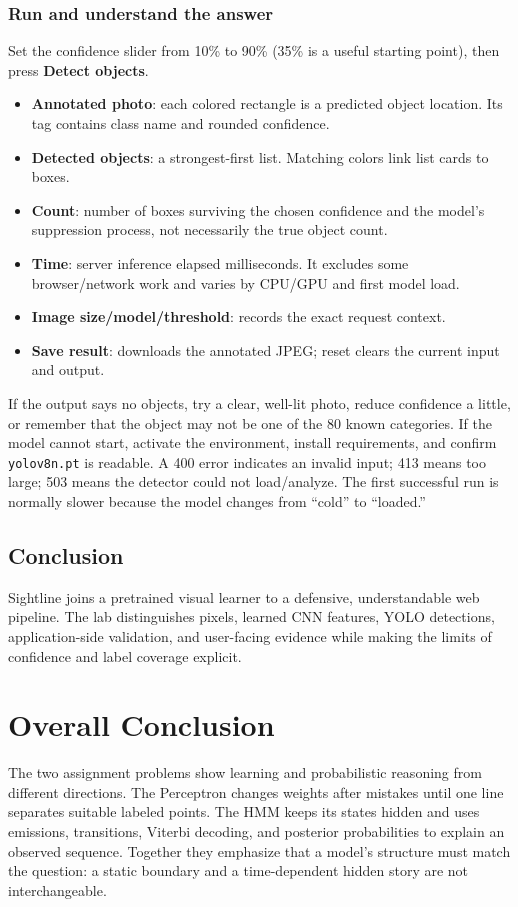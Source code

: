 \documentclass[12pt,a4paper,openany]{report}
\begin{document}
\subsection{Run and understand the answer}
Set the confidence slider from 10\% to 90\% (35\% is a useful starting point),
then press \textbf{Detect objects}.
\begin{itemize}
  \item \textbf{Annotated photo}: each colored rectangle is a predicted object
  location. Its tag contains class name and rounded confidence.
  \item \textbf{Detected objects}: a strongest-first list. Matching colors link
  list cards to boxes.
  \item \textbf{Count}: number of boxes surviving the chosen confidence and the
  model's suppression process, not necessarily the true object count.
  \item \textbf{Time}: server inference elapsed milliseconds. It excludes some
  browser/network work and varies by CPU/GPU and first model load.
  \item \textbf{Image size/model/threshold}: records the exact request context.
  \item \textbf{Save result}: downloads the annotated JPEG; reset clears the
  current input and output.
\end{itemize}

If the output says no objects, try a clear, well-lit photo, reduce confidence a
little, or remember that the object may not be one of the 80 known categories.
If the model cannot start, activate the environment, install requirements, and
confirm \texttt{yolov8n.pt} is readable. A 400 error indicates an invalid input;
413 means too large; 503 means the detector could not load/analyze. The first
successful run is normally slower because the model changes from ``cold'' to
``loaded.''

\section{Conclusion}
Sightline joins a pretrained visual learner to a defensive, understandable web
pipeline. The lab distinguishes pixels, learned CNN features, YOLO detections,
application-side validation, and user-facing evidence while making the limits
of confidence and label coverage explicit.

\fi
\chapter*{Overall Conclusion}
\ifdefined\AssignmentVersion
The two assignment problems show learning and probabilistic reasoning from
different directions. The Perceptron changes weights after mistakes until one
line separates suitable labeled points. The HMM keeps its states hidden and
uses emissions, transitions, Viterbi decoding, and posterior probabilities to
explain an observed sequence. Together they emphasize that a model's structure
must match the question: a static boundary and a time-dependent hidden story
are not interchangeable.
\end{document}
